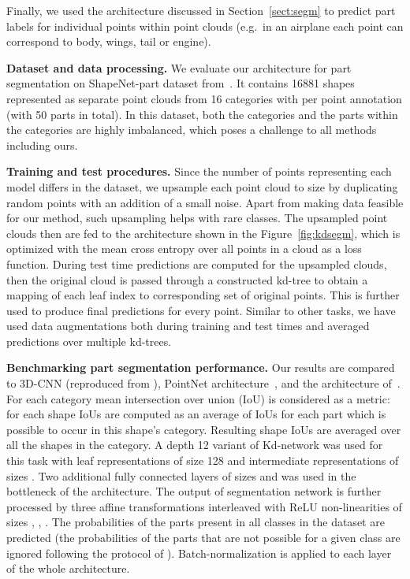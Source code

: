 \documentclass[10pt,twocolumn,letterpaper]{article}
\newcommand{\fig}[1]{Figure~\ref{fig:#1}}
\newcommand{\sect}[1]{Section~\ref{sect:#1}}
\begin{document}
Finally, we used the architecture discussed in \sect{segm} to predict part labels for individual points within point clouds (e.g.\ in an airplane each point can correspond to body, wings, tail or engine).

\textbf{Dataset and data processing.} We evaluate our architecture for part segmentation on ShapeNet-part dataset from~\cite{Yi16}. It contains 16881 shapes represented as separate point clouds from 16 categories with per point annotation (with 50 parts in total). In this dataset, both the categories and the parts within the categories are highly imbalanced, which poses a challenge to all methods including ours.

\textbf{Training and test procedures.} Since the number of points representing each model differs in the dataset, we upsample each point cloud to size  by duplicating random points with an addition of a small noise. Apart from making data feasible for our method, such upsampling helps with rare classes. The upsampled point clouds then are fed to the architecture shown in the \fig{kdsegm}, which is optimized with the mean cross entropy over all points in a cloud as a loss function. During test time predictions are computed for the upsampled clouds, then the original cloud is passed through a constructed kd-tree to obtain a mapping of each leaf index to corresponding set of original points. This is further used to produce final predictions for every point. Similar to other tasks, we have used data augmentations both during training and test times and averaged predictions over multiple kd-trees.

\textbf{Benchmarking part segmentation performance.} Our results are compared to 3D-CNN (reproduced from \cite{Qi16b}), PointNet architecture~\cite{Qi16b}, and the architecture of~\cite{Yi16}. For each category mean intersection over union (IoU) is considered as a metric: for each shape IoUs are computed as an average of IoUs for each part which is possible to occur in this shape's category. Resulting shape IoUs are averaged over all the shapes in the category. A depth 12 variant of Kd-network was used for this task with leaf representations of size 128 and intermediate representations of sizes . Two additional fully connected layers of sizes  and  was used in the bottleneck of the architecture. The output of segmentation network is further processed by three affine transformations interleaved with ReLU non-linearities of sizes , , . The probabilities of the  parts present in all classes in the dataset are predicted (the probabilities of the parts that are not possible for a given class are ignored following the protocol of \cite{Qi16b}). Batch-normalization is applied to each layer of the whole architecture.
\end{document}
